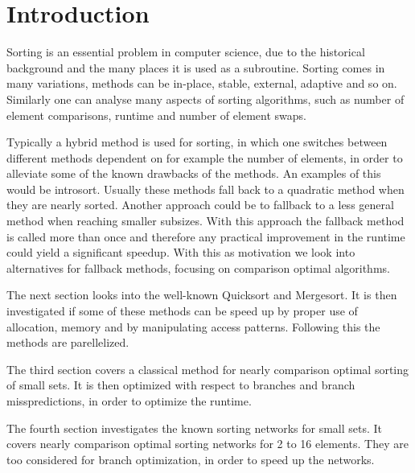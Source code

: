 \section{Introduction}
Sorting is an essential problem in computer science, due to the historical background and the many places it is used as a subroutine. Sorting comes in many variations, methods can be in-place, stable, external, adaptive and so on. Similarly one can analyse many aspects of sorting algorithms, such as number of element comparisons, runtime and number of element swaps.

Typically a hybrid method is used for sorting, in which one switches between different methods dependent on for example the number of elements, in order to alleviate some of the known drawbacks of the methods. An examples of this would be introsort\cite{m97}. Usually these methods fall back to a quadratic method when they are nearly sorted. Another approach could be to fallback to a less general method when reaching smaller subsizes. With this approach the fallback method is called more than once and therefore any practical improvement in the runtime could yield a significant speedup. With this as motivation we look into alternatives for fallback methods, focusing on comparison optimal algorithms.


The next section looks into the well-known Quicksort and Mergesort. It is then investigated if some of these methods can be speed up by proper use of allocation, memory and by manipulating access patterns. Following this the methods are parellelized.

The third section covers a classical method for nearly comparison optimal sorting of small sets. It is then optimized with respect to branches and branch misspredictions, in order to optimize the runtime.

The fourth section investigates the known sorting networks for small sets. It covers nearly comparison optimal sorting networks for 2 to 16 elements. They are too considered for branch optimization, in order to speed up the networks.

